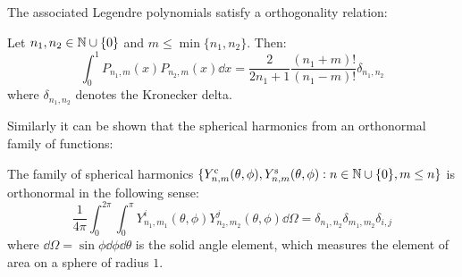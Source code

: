\documentclass[../main.tex]{subfiles}
\begin{document}
The associated Legendre polynomials satisfy a orthogonality relation:
\begin{lemma}\label{lem:ortho_asso_legendre}
  Let $n_1,n_2\in\mathbb{N}\cup\{0\}$ and $m\leq \min\{n_1,n_2\}$. Then:
  \begin{equation}
    \int_0^1 P_{n_1,m}(x) P_{n_2,m}(x) \dd{x}=\frac{2}{2n_1+1}\frac{(n_1+m)!}{(n_1-m)!} \delta_{n_1,n_2}
  \end{equation}
  where $\delta_{n_1,n_2}$ denotes the Kronecker delta.
\end{lemma}
Similarly it can be shown that the spherical harmonics from an orthonormal family of functions:
\begin{proposition}
  The family of spherical harmonics $\{Y_{n,m}^{\mathrm{c}}(\theta,\phi),Y_{n,m}^{\mathrm{s}}(\theta,\phi):n\in\mathbb{N}\cup\{0\},m\leq n\}$ is orthonormal in the following sense:
  \begin{equation}\label{eq:ortho_spherical_harmonics}
    \frac{1}{4\pi}\int_0^{2\pi}\int_0^\pi Y_{n_1,m_1}^i(\theta,\phi) Y_{n_2,m_2}^j(\theta,\phi)\dd\Omega=\delta_{n_1,n_2}\delta_{m_1,m_2}\delta_{i,j}
  \end{equation}
  where $\dd\Omega=\sin\phi\dd{\phi}\dd{\theta}$ is the solid angle element, which measures the element of area on a sphere of radius $1$.
\end{proposition}
\end{document}
